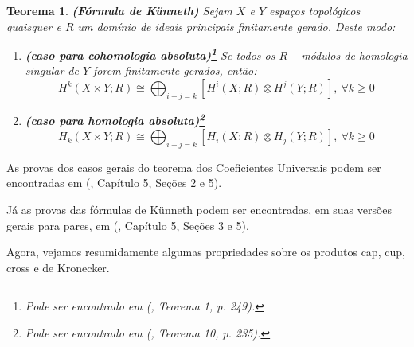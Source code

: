 \documentclass[12pt,oneside]{book} %
\newtheorem{teo}    {\hspace{0.5cm}Teorema}[chapter]
\newcommand{\ds}{\displaystyle}
\newcommand{\tensor}{\otimes}
\begin{document}
\begin{teo}{\bf (Fórmula de Künneth)}
	Sejam $X$ e $Y$ espaços topológicos quaisquer e $R$ um domínio de ideais principais finitamente gerado. Deste modo:
	\begin{enumerate}
		\item \textbf{(caso para cohomologia absoluta)\footnote{Pode ser encontrado em (\cite{spanier}, Teorema 1, p. 249).}} Se todos os $R-$módulos de homologia singular de $Y$ forem finitamente gerados, então:
		$$ H^{k}(X\times Y;R)\cong \ds\bigoplus_{i+j=k}\left[ H^{i}(X;R)\tensor H^{j}(Y;R)\right], \ \forall k\geq 0 $$	
		\item \textbf{(caso para homologia absoluta)\footnote{Pode ser encontrado em (\cite{spanier}, Teorema 10, p. 235).}} 
		$$ H_{k}(X\times Y;R)\cong \ds\bigoplus_{i+j=k}\left[ H_{i}(X;R)\tensor H_{j}(Y;R)\right], \ \forall k\geq 0 $$
	\end{enumerate}
\end{teo}

\par As provas dos casos gerais do teorema dos Coeficientes Universais podem ser encontradas em (\cite{spanier}, Capítulo 5, Seções 2 e 5).

\par Já as provas das fórmulas de Künneth podem ser encontradas, em suas versões gerais para pares, em (\cite{spanier}, Capítulo 5, Seções 3 e 5).

\par Agora, vejamos resumidamente algumas propriedades sobre os produtos cap, cup, cross e de Kronecker.
\end{document}
